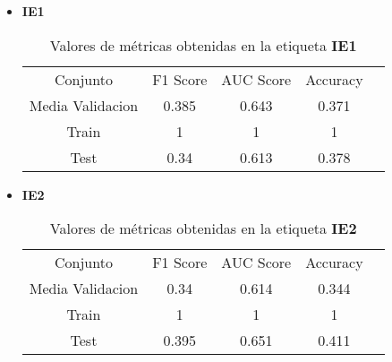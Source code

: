 \begin{itemize}
	\item \textbf{IE1}
	      \begin{table}[H]
		      \centering
		      \begin{tabular}{|c|c|c|c|c}
			      \cline{1-4}
			      Conjunto         & F1 Score & AUC Score & Accuracy \\ \cline{1-4}
			      Media Validacion & 0.385    & 0.643     & 0.371    \\ \cline{1-4}
			      Train            & 1        & 1         & 1        \\ \cline{1-4}
			      Test             & 0.34     & 0.613     & 0.378    \\ \cline{1-4}
		      \end{tabular}
		      \caption{Valores de métricas obtenidas en la etiqueta \textbf{IE1}}
	      \end{table}
	\item  \textbf{IE2}
	      \begin{table}[H]
		      \centering
		      \begin{tabular}{|c|c|c|c|c}
			      \cline{1-4}
			      Conjunto         & F1 Score & AUC Score & Accuracy \\ \cline{1-4}
			      Media Validacion & 0.34     & 0.614     & 0.344    \\ \cline{1-4}
			      Train            & 1        & 1         & 1        \\ \cline{1-4}
			      Test             & 0.395    & 0.651     & 0.411    \\ \cline{1-4}
		      \end{tabular}
		      \caption{Valores de métricas obtenidas en la etiqueta \textbf{IE2}}
	      \end{table}


\end{itemize}
